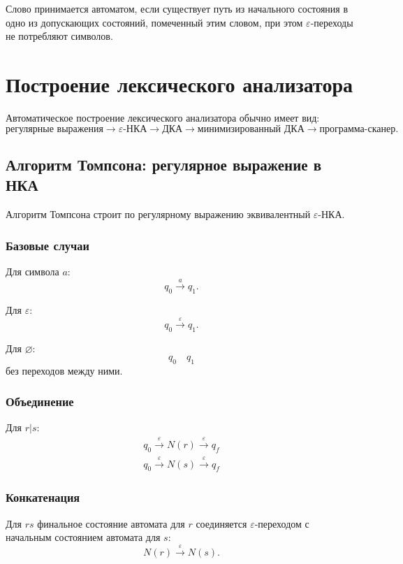 \documentclass[12pt,a4paper]{article}
\begin{document}
Слово принимается автоматом, если существует путь из начального состояния в одно из допускающих состояний, помеченный этим словом, при этом $\varepsilon$-переходы не потребляют символов.

\section{Построение лексического анализатора}

Автоматическое построение лексического анализатора обычно имеет вид:
\[
\text{регулярные выражения}
\longrightarrow
\varepsilon\text{-НКА}
\longrightarrow
\text{ДКА}
\longrightarrow
\text{минимизированный ДКА}
\longrightarrow
\text{программа-сканер}.
\]

\subsection{Алгоритм Томпсона: регулярное выражение в НКА}

Алгоритм Томпсона строит по регулярному выражению эквивалентный $\varepsilon$-НКА.

\subsubsection*{Базовые случаи}

Для символа $a$:
\[
q_0 \xrightarrow{a} q_1.
\]

Для $\varepsilon$:
\[
q_0 \xrightarrow{\varepsilon} q_1.
\]

Для $\varnothing$:
\[
q_0 \quad q_1
\]
без переходов между ними.

\subsubsection*{Объединение}

Для $r|s$:
\[
\begin{array}{c}
q_0 \xrightarrow{\varepsilon} N(r) \xrightarrow{\varepsilon} q_f\\
q_0 \xrightarrow{\varepsilon} N(s) \xrightarrow{\varepsilon} q_f
\end{array}
\]

\subsubsection*{Конкатенация}

Для $rs$ финальное состояние автомата для $r$ соединяется $\varepsilon$-переходом с начальным состоянием автомата для $s$:
\[
N(r) \xrightarrow{\varepsilon} N(s).
\]
\end{document}
